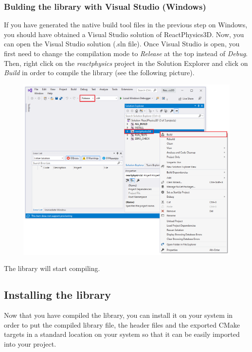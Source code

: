 \documentclass[a4paper,12pt]{article}
\begin{document}
     \subsubsection{Bulding the library with Visual Studio (Windows)}

     If you have generated the native build tool files in the previous step on Windows, you should have obtained a Visual Studio solution of ReactPhysics3D.
     Now, you can open the Visual Studio solution (.sln file). Once Visual Studio is open, you first need to change the compilation mode to \emph{Release}
     at the top instead of \emph{Debug}. Then, right click on the \emph{reactphysics} project in the Solution
     Explorer and click on \emph{Build} in order to compile the library (see the following picture).

    \begin{figure}[!ht]
        \centering
        \includegraphics[scale=0.5]{VSBuild.png}
        \label{fig:vsbuild}
    \end{figure}

    The library will start compiling.

     \subsection{Installing the library}

     Now that you have compiled the library, you can install it on your system in order to put the compiled library file, the header files and the exported
     CMake targets in a standard location on your system so that it can be easily imported into your project.
    
\end{document}
